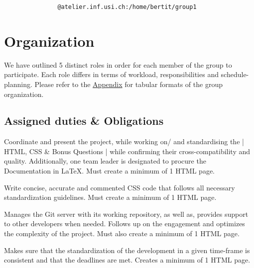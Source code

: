 \documentclass[a4paper,10pt]{article}
\begin{document}
\begin{center}\begin{verbatim}
               @atelier.inf.usi.ch:/home/bertit/group1
              \end{verbatim}
\end{center}
\section{Organization}
We have outlined 5 distinct roles in order for each member of the group to participate. Each role differs in terms of workload, responsibilities and schedule-planning. Please refer to the \hyperref[sec:Appendix]{Appendix} for tabular formats of the group organization.
\subsection*{Assigned duties \& Obligations}
 \begin{description}
 \leftskip=0.2cm\item[Team Leader:] Coordinate and present the project, while working on/ and standardising the | HTML, CSS \& Bonus Questions | while confirming their cross-compatibility and quality. Additionally, one team leader is designated to procure the Documentation in LaTeX. Must create a minimum of 1 HTML page.
\end{description}

 \begin{description}
 \leftskip=0.2cm\item[CSS Leader:] Write concise, accurate and commented CSS code that follows all necessary standardization guidelines. Must create a minimum of 1 HTML page.
\end{description}

 \begin{description}
 \leftskip=0.2cm\item[Git Leader:] Manages the Git server with its working repository, as well as, provides support to other developers when needed. Follows up on the engagement and optimizes the complexity of the project. Must also create a minimum of 1 HTML page.
\end{description}

\begin{description}
 \leftskip=0.2cm\item[Topic Leader:] Makes sure that the standardization of the development in a given time-frame is consistent and that the deadlines are met. Creates a minimum of 1 HTML page.
\end{description}
\end{document}
